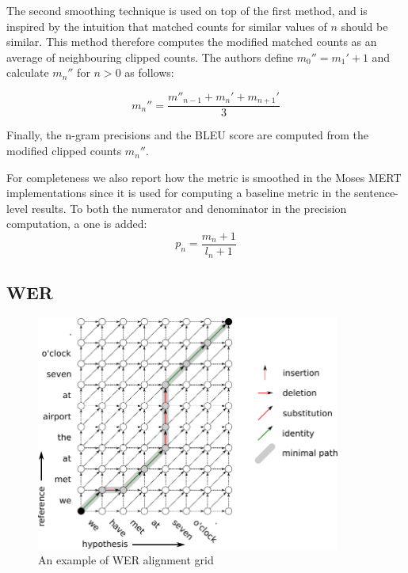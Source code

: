 The second smoothing technique is used on top of the first method, and is inspired by
the intuition that matched counts for similar values of $n$ should be similar.
This method therefore computes the modified matched counts as an average of
neighbouring clipped counts. The authors define $m_0'' = m_1' + 1$ and
calculate $m_n''$ for $n > 0$ as follows:

\begin{equation*}
    m_n'' = \frac{
        m''_{n-1} + m_n' + m_{n+1}'
    }{
        3
    }
\end{equation*}

Finally, the n-gram precisions and the BLEU score are computed from the modified
clipped counts $m_n''$.

For completeness we also report how the  metric is smoothed in
the Moses MERT implementations since it is used for computing a baseline metric
 in the sentence-level results. To both the numerator and denominator
in the precision computation, a one is added:
\begin{equation*}
    p_n = \frac{
        m_n + 1
    }{
        l_n + 1
    }
\end{equation*}

\subsection{WER}

\begin{figure}
    \begin{center}
        \includegraphics[width=10cm]{img/wer-grid.pdf}
    \end{center}

    \caption{An example of WER alignment grid}
    \label{wer-grid}
\end{figure}

